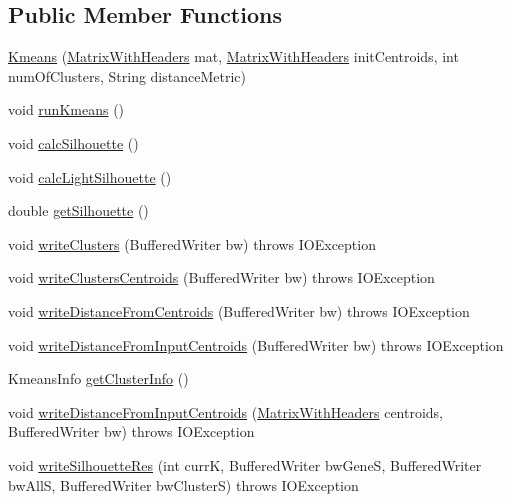 \subsection*{Public Member Functions}
\begin{DoxyCompactItemize}
\item 
\hyperlink{classbroad_1_1pda_1_1geneexpression_1_1clustering_1_1_kmeans_a8f59bfa27715e0e3d7c16203b931077f}{Kmeans} (\hyperlink{classbroad_1_1core_1_1datastructures_1_1_matrix_with_headers}{Matrix\+With\+Headers} mat, \hyperlink{classbroad_1_1core_1_1datastructures_1_1_matrix_with_headers}{Matrix\+With\+Headers} init\+Centroids, int num\+Of\+Clusters, String distance\+Metric)
\item 
void \hyperlink{classbroad_1_1pda_1_1geneexpression_1_1clustering_1_1_kmeans_a7b0b071d034a9aa7b818030254e0dc24}{run\+Kmeans} ()
\item 
void \hyperlink{classbroad_1_1pda_1_1geneexpression_1_1clustering_1_1_kmeans_a8e87cbb019573c9672027b8eb220e7c4}{calc\+Silhouette} ()
\item 
void \hyperlink{classbroad_1_1pda_1_1geneexpression_1_1clustering_1_1_kmeans_acd4f82d43bf7e3096bbf31c13ffdc2ec}{calc\+Light\+Silhouette} ()
\item 
double \hyperlink{classbroad_1_1pda_1_1geneexpression_1_1clustering_1_1_kmeans_ad1f0deb93ba760134439cc50caadee96}{get\+Silhouette} ()
\item 
void \hyperlink{classbroad_1_1pda_1_1geneexpression_1_1clustering_1_1_kmeans_a1befc9e064497a642ced1fcc2710d94c}{write\+Clusters} (Buffered\+Writer bw)  throws I\+O\+Exception 
\item 
void \hyperlink{classbroad_1_1pda_1_1geneexpression_1_1clustering_1_1_kmeans_a659cc69cf0d6ad36a7ad12d3652f0dee}{write\+Clusters\+Centroids} (Buffered\+Writer bw)  throws I\+O\+Exception 
\item 
void \hyperlink{classbroad_1_1pda_1_1geneexpression_1_1clustering_1_1_kmeans_ab5f7940a6f9823b9100fd22d86d95dc9}{write\+Distance\+From\+Centroids} (Buffered\+Writer bw)  throws I\+O\+Exception 
\item 
void \hyperlink{classbroad_1_1pda_1_1geneexpression_1_1clustering_1_1_kmeans_aba97bbed4d48ba0bd322716552b7fe7b}{write\+Distance\+From\+Input\+Centroids} (Buffered\+Writer bw)  throws I\+O\+Exception 
\item 
Kmeans\+Info \hyperlink{classbroad_1_1pda_1_1geneexpression_1_1clustering_1_1_kmeans_a5cc4e3945675d6a8cd1686737a4d916a}{get\+Cluster\+Info} ()
\item 
void \hyperlink{classbroad_1_1pda_1_1geneexpression_1_1clustering_1_1_kmeans_aa47a2f34a55edc36741cec7757dd0674}{write\+Distance\+From\+Input\+Centroids} (\hyperlink{classbroad_1_1core_1_1datastructures_1_1_matrix_with_headers}{Matrix\+With\+Headers} centroids, Buffered\+Writer bw)  throws I\+O\+Exception 
\item 
void \hyperlink{classbroad_1_1pda_1_1geneexpression_1_1clustering_1_1_kmeans_a4e6ab714c6c3e99e8a44d85a5a28ac61}{write\+Silhouette\+Res} (int curr\+K, Buffered\+Writer bw\+Gene\+S, Buffered\+Writer bw\+All\+S, Buffered\+Writer bw\+Cluster\+S)  throws I\+O\+Exception 
\end{DoxyCompactItemize}
